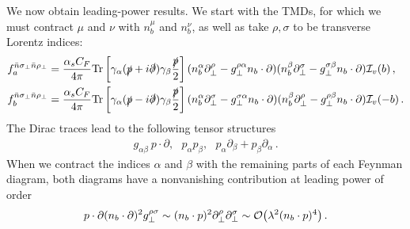 \documentclass[11pt,a4paper]{article}
\newcommand{\nn}{\nonumber}
\newcommand{\bn}{{\bar{n}}}
\newcommand{\Tr}{\mathrm{Tr}}
\begin{document}
We now obtain leading-power results. We start with the TMDs, for which we must contract $\mu$ and $\nu$ with $n_b^\mu$ and $n_b^\nu$, as well as take $\rho, \sigma$ to be transverse Lorentz indices:
\begin{align}\label{eq:a24}
	f_a^{\bn\sigma_\perp \bn\rho_\perp} &= {\alpha_sC_F\over 4\pi}  \Tr\left[\gamma_\alpha (\slashed{p}+i\slashed{\partial}) \gamma_\beta {\slashed p\over2} \right](n_b^{\alpha} \partial^\rho_\perp - g^{\rho\alpha}_\perp n_b\cdot\partial )(n_b^\beta\partial^\sigma_\perp  - g_\perp^{\sigma\beta}n_b\cdot \partial  ) {\cal I}_v(b)\,,\nn\\
	f_b^{\bn\sigma_\perp \bn\rho_\perp} &= {\alpha_sC_F\over 4\pi}\Tr\left[\gamma_\alpha (\slashed{p}-i\slashed{\partial}) \gamma_\beta {\slashed p\over2}  \right](n_b^\alpha \partial^\sigma_\perp -  g^{\sigma\alpha}_\perp n_b\cdot \partial )( n_b^{\beta}\partial^\rho_\perp -  g^{\rho\beta}_\perp n_b\cdot \partial) {\cal I}_v(-b)\,.
\end{align}
The Dirac traces lead to the following tensor structures
\begin{align}
	g_{\alpha\beta}\ p\cdot \partial,\,\,\,\, p_\alpha p_\beta,\,\,\,\, p_\alpha \partial_{\beta}+p_\beta \partial_{\alpha}\,.
\end{align}
When we contract the indices $\alpha$ and $\beta$ with the remaining parts of each Feynman diagram, both diagrams have a nonvanishing contribution at leading power of order
\begin{align}
	p\cdot \partial (n_b\cdot \partial)^2g_\perp^{\rho \sigma}
	\sim (n_b\cdot p)^2\partial_\perp^\rho \partial_\perp^\sigma
	\sim {\cal O}\bigl(\lambda^2(n_b\cdot p)^4\bigr)
	\,.
\end{align}
\end{document}
